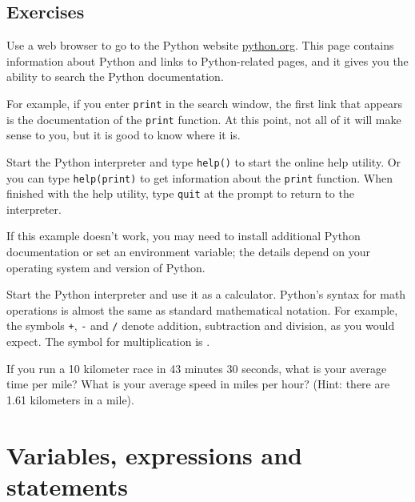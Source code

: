 \documentclass[10pt]{book}
\begin{document}
\section{Exercises}

\begin{ex}
Use a web browser to go to the Python website \url{python.org}.
This page contains information about Python and links
to Python-related pages, and it gives you the ability to search
the Python documentation.

For example, if you enter {\tt print} in the search window, the
first link that appears is the documentation of the {\tt print}
function.  At this point, not all of it will make sense to you,
but it is good to know where it is. %

\end{ex}

\begin{ex}
Start the Python interpreter and type {\tt help()} to start the online
help utility.  Or you can type \verb"help(print)" to get information
about the {\tt print} function. When finished with the help utility, type {\tt{quit}} at the prompt to return to the interpreter. 

If this example doesn't work, you
may need to install additional Python documentation or set an
environment variable; the details depend on your operating system and
version of Python.

\end{ex}

\begin{ex}
Start the Python interpreter and use it as a calculator.
Python's syntax for math operations is almost the same as
standard mathematical notation.  For example, the symbols
{\tt +}, {\tt -} and {\tt /} denote addition, subtraction
and division, as you would expect.  The symbol for
multiplication is {\tt *}.

If you run a 10 kilometer race in 43 minutes 30 seconds, what is your
average time per mile?  What is your average speed in miles per hour?
(Hint: there are 1.61 kilometers in a mile).


\end{ex}




\chapter{Variables, expressions and statements}
\end{document}
